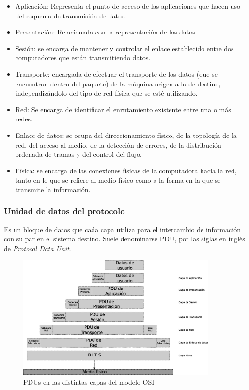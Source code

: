 \begin{itemize}
	\item Aplicación: Representa el punto de acceso de las aplicaciones que hacen uso del esquema de transmisión de datos.
	\item Presentación: Relacionada con la representación de los datos.
	\item Sesión: se encarga de mantener y controlar el enlace establecido entre dos computadores que están transmitiendo datos.
	\item Transporte: encargada de efectuar el transporte de los datos (que se encuentran dentro del paquete) de la máquina origen a la de destino, independizándolo del tipo de red física que se esté utilizando.
	\item Red: Se encarga de identificar el enrutamiento existente entre una o más redes.
	\item Enlace de datos: se ocupa del direccionamiento físico, de la topología de la red, del acceso al medio, de la detección de errores, de la distribución ordenada de tramas y del control del flujo.
	\item Física: se encarga de las conexiones físicas de la computadora hacia la red, tanto en lo que se refiere al medio físico como a la forma en la que se transmite la información.
\end{itemize}

\subsubsection{Unidad de datos del protocolo}

Es un bloque de datos que cada capa utiliza para el intercambio de información con su par en el sistema destino. Suele denominarse PDU, por las siglas en inglés de \textit{Protocol Data Unit}.

\begin{figure}[h]
  \centering
	\includegraphics[width=0.90\textwidth]{2-sistema/graf/pdu.eps}
  \caption{PDUs en las distintas capas del modelo OSI}
  \label{fig:pdu}
\end{figure}

